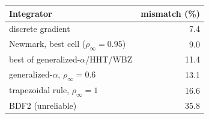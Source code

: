 \begin{tabular}{lr}\toprule
Integrator & mismatch (\%) \\\midrule
discrete gradient & 7.4 \\
Newmark, best cell ($\rho_\infty=0.95$) & 9.0 \\
best of generalized-$\alpha$/HHT/WBZ & 11.4 \\
generalized-$\alpha$, $\rho_\infty=0.6$ & 13.1 \\
trapezoidal rule, $\rho_\infty=1$ & 16.6 \\
BDF2 (unreliable) & 35.8 \\
\bottomrule\end{tabular}
